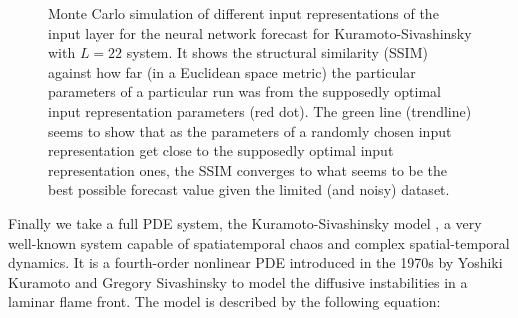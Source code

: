 \documentclass[journal]{IEEEtran}
\begin{document}
\begin{figure}[!htb]
\centering
{}
\caption{Monte Carlo simulation of different  input representations of the input layer for the neural network forecast for
Kuramoto-Sivashinsky with $L=22$ system.
It shows the structural similarity (SSIM) against how far (in a Euclidean space metric) the particular parameters of a particular
run was from the supposedly optimal  input representation  parameters (red dot). The green line (trendline) seems to show that as the parameters
of a randomly chosen  input representation  get close to the supposedly optimal  input representation  ones, the SSIM converges to what seems to be the
best possible forecast value given the limited (and noisy) dataset.}
\label{MonteCarloSSIMversusParameterMetricDistanceKS_L=22}
\end{figure}


Finally we take a full PDE system, the Kuramoto-Sivashinsky model \cite{1976PThPh..55..356K,1977AcAau...4.1177S},
a very well-known system capable of spatiatemporal chaos
and complex spatial-temporal dynamics. It is a fourth-order nonlinear PDE introduced in the 1970s by Yoshiki
Kuramoto and Gregory Sivashinsky to model the diffusive instabilities
in a laminar flame front.
The model is described by the following equation:
\end{document}

